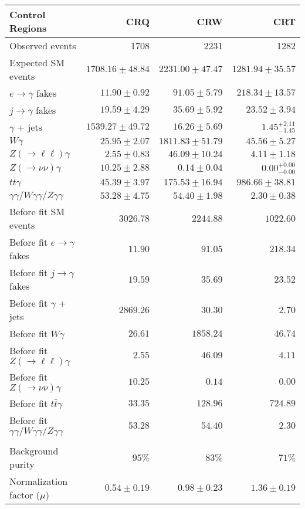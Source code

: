 \begin{tabular}{lrrr}
\hline
Control Regions & CRQ & CRW & CRT \\
\hline
Observed events & 1708 & 2231 & 1282 \\
\hline
Expected SM events & $1708.16 \pm 48.84$ & $2231.00 \pm 47.47$ & $1281.94 \pm 35.57$ \\
\hline
$e\rightarrow\gamma$ fakes & $11.90 \pm 0.92$ & $91.05 \pm 5.79$ & $218.34 \pm 13.57$ \\
$j\rightarrow\gamma$ fakes & $19.59 \pm 4.29$ & $35.69 \pm 5.92$ & $23.52 \pm 3.94$ \\
$\gamma$ + jets & $1539.27 \pm 49.72$ & $16.26 \pm 5.69$ & $1.45_{-1.45}^{+2.11}$ \\
$W\gamma$ & $25.95 \pm 2.07$ & $1811.83 \pm 51.79$ & $45.56 \pm 5.27$ \\
$Z(\rightarrow\ell\ell)\gamma$ & $2.55 \pm 0.83$ & $46.09 \pm 10.24$ & $4.11 \pm 1.18$ \\
$Z(\rightarrow\nu\nu)\gamma$ & $10.25 \pm 2.88$ & $0.14 \pm 0.04$ & $0.00_{-0.00}^{+0.00}$ \\
$t\bar{t}\gamma$ & $45.39 \pm 3.97$ & $175.53 \pm 16.94$ & $986.66 \pm 38.81$ \\
$\gamma\gamma / W\gamma\gamma / Z\gamma\gamma$ & $53.28 \pm 4.75$ & $54.40 \pm 1.98$ & $2.30 \pm 0.38$ \\
\hline
Before fit SM events & $3026.78$ & $2244.88$ & $1022.60$ \\
\hline
Before fit $e\rightarrow\gamma$ fakes & $11.90$ & $91.05$ & $218.34$ \\
Before fit $j\rightarrow\gamma$ fakes & $19.59$ & $35.69$ & $23.52$ \\
Before fit $\gamma$ + jets & $2869.26$ & $30.30$ & $2.70$ \\
Before fit $W\gamma$ & $26.61$ & $1858.24$ & $46.74$ \\
Before fit $Z(\rightarrow\ell\ell)\gamma$ & $2.55$ & $46.09$ & $4.11$ \\
Before fit $Z(\rightarrow\nu\nu)\gamma$ & $10.25$ & $0.14$ & $0.00$ \\
Before fit $t\bar{t}\gamma$ & $33.35$ & $128.96$ & $724.89$ \\
Before fit $\gamma\gamma / W\gamma\gamma / Z\gamma\gamma$ & $53.28$ & $54.40$ & $2.30$ \\
\hline
 &  &  &  \\
\hline
Background purity & $95\%$ & $83\%$ & $71\%$ \\
\hline
Normalization factor ($\mu$) & $0.54 \pm 0.19$ & $0.98 \pm 0.23$ & $1.36 \pm 0.19$ \\
\hline
\end{tabular}
